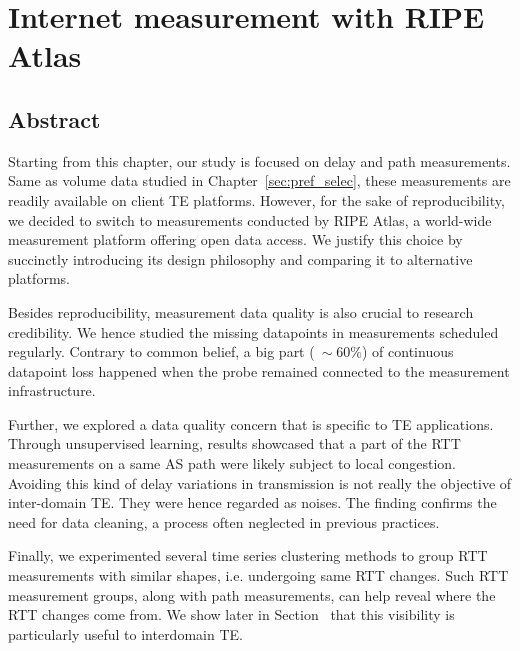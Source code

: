 \chapter{Internet measurement with RIPE Atlas}
\label{sec:ripe_atlas}
\section*{Abstract}

Starting from this chapter, our study is focused on delay and path measurements.
Same as volume data studied in Chapter~\ref{sec:pref_selec}, these measurements are readily available on client TE platforms.
However, for the sake of reproducibility, we decided to switch to measurements conducted by RIPE Atlas, a world-wide measurement platform offering open data access. We justify this choice by succinctly introducing its design philosophy and comparing it to alternative platforms.


Besides reproducibility, measurement data quality is also crucial to research credibility.
We hence studied the missing datapoints in measurements scheduled regularly. 
Contrary to common belief, a big part ($~\sim 60\%$) of continuous datapoint loss happened when the probe remained connected to the measurement infrastructure.

Further, we explored a data quality concern that is specific to TE applications.
Through unsupervised learning, results showcased that a part of the RTT measurements on a same AS path were likely subject to local congestion.
Avoiding this kind of delay variations in transmission is not really the objective of inter-domain TE.
They were hence regarded as noises.
The finding confirms the need for data cleaning, a process often neglected in previous practices.

Finally, we experimented several time series clustering methods to group RTT measurements with similar shapes, i.e. undergoing same RTT changes.
Such RTT measurement groups, along with path measurements, can help reveal where the RTT changes come from.
We show later in Section~ that this visibility is particularly useful to interdomain TE.
\clearpage


